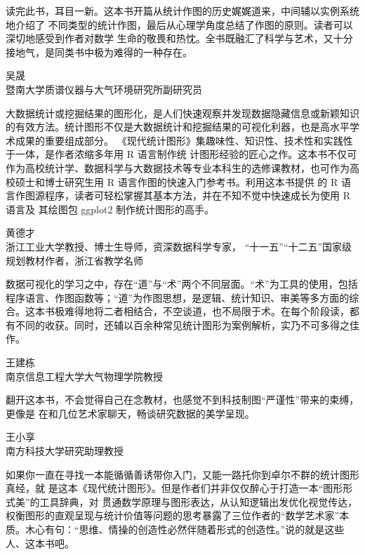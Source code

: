 \documentclass[
  b5paper,
  UTF8,twoside]{book}
\begin{document}
读完此书，耳目一新。这本书开篇从统计作图的历史娓娓道来，中间辅以实例系统地介绍了 不同类型的统计作图，最后从心理学角度总结了作图的原则。读者可以深切地感受到作者对数学 生命的敬畏和热忱。全书既融汇了科学与艺术，又十分接地气，是同类书中极为难得的一种存在。

\begin{flushright}
吴晟\\
暨南大学质谱仪器与大气环境研究所副研究员
\end{flushright}

大数据统计或挖掘结果的图形化，是人们快速观察并发现数据隐藏信息或新颖知识的有效方法。统计图形不仅是大数据统计和挖掘结果的可视化利器，也是高水平学术成果的重要组成部分。
《现代统计图形》集趣味性、知识性、技术性和实践性于一体，是作者浓缩多年用 R 语言制作统 计图形经验的匠心之作。这本书不仅可作为高校统计学、数据科学与大数据技术等专业本科生的选修课教材，也可作为高校硕士和博士研究生用 R 语言作图的快速入门参考书。利用这本书提供 的 R 语言作图源程序，读者可轻松掌握其基本方法，并在不知不觉中快速成长为使用 R 语言及 其绘图包 ggplot2 制作统计图形的高手。

\begin{flushright}
黄德才\\
浙江工业大学教授、博士生导师，资深数据科学专家，
``十一五''``十二五''国家级规划教材作者，浙江省教学名师
\end{flushright}

数据可视化的学习之中，存在``道''与``术''两个不同层面。``术''为工具的使用，包括程序语言、作图函数等；``道''为作图思想，是逻辑、统计知识、审美等多方面的综合。这本书极难得地将二者相结合，不空谈道，也不局限于术。在每个阶段读，都有不同的收获。同时，还辅以百余种常见统计图形为案例解析，实乃不可多得之佳作。

\begin{flushright}
王建栋\\
南京信息工程大学大气物理学院教授
\end{flushright}

翻开这本书，不会觉得自己在念教材，也感觉不到科技制图``严谨性''带来的束缚，更像是
在和几位艺术家聊天，畅谈研究数据的美学呈现。

\begin{flushright}
王小享\\
南方科技大学研究助理教授
\end{flushright}

如果你一直在寻找一本能循循善诱带你入门，又能一路托你到卓尔不群的统计图形真经，就 是这本《现代统计图形》。但是作者们并非仅仅醉心于打造一本``图形形式美''的工具辞典，对 贯通数学原理与图形表达，从认知逻辑出发优化视觉传达，权衡图形的直观呈现与统计价值等问题的思考暴露了三位作者的``数学艺术家''本质。木心有句：``思维、情操的创造性必然伴随着形式的创造性。''说的就是这些人、这本书吧。
\end{document}

